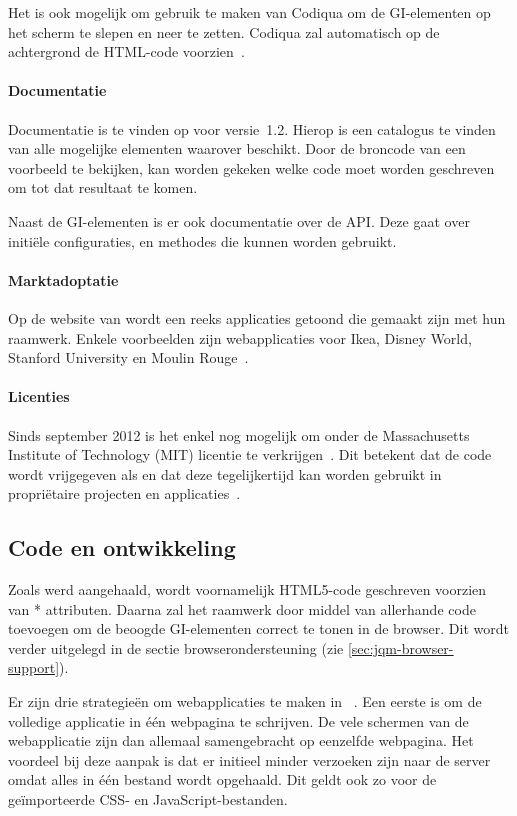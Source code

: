 Het is ook mogelijk om gebruik te maken van Codiqua om de GI-elementen op het scherm te slepen en neer te zetten. 
Codiqua zal automatisch op de achtergrond de HTML-code voorzien~\cite{Sperry2012}.

\paragraph{Documentatie}
Documentatie is te vinden op  voor versie~1.2. 
Hierop is een catalogus te vinden van alle mogelijke elementen waarover \jqm{} beschikt. 
Door de broncode van een voorbeeld te bekijken, kan worden gekeken welke code moet worden geschreven om tot dat resultaat te komen.

Naast de GI-elementen is er ook documentatie over de API. 
Deze gaat over initiële configuraties,  en methodes die kunnen worden gebruikt.

\paragraph{Marktadoptatie}
Op de website van \jqm{} wordt een reeks applicaties getoond die gemaakt zijn met hun raamwerk. 
Enkele voorbeelden zijn webapplicaties voor Ikea, Disney World, Stanford University en Moulin Rouge~\cite{JQuery2012a}. 

\paragraph{Licenties}
Sinds september 2012 is het enkel nog mogelijk om \jqm{} onder de Massachusetts Institute of Technology (MIT) licentie te verkrijgen~\cite{Dmethvin2012}. 
Dit betekent dat de code wordt vrijgegeven als  en dat deze tegelijkertijd kan worden gebruikt in propriëtaire projecten en applicaties~\cite{PhilDutson2012}.

\subsection{Code en ontwikkeling}
Zoals werd aangehaald, wordt voornamelijk HTML5-code geschreven voorzien van * attributen. 
Daarna zal het raamwerk door middel van  allerhande code toevoegen om de beoogde GI-elementen correct te tonen in de browser. 
Dit wordt verder uitgelegd in de sectie browserondersteuning (zie \ref{sec:jqm-browser-support}).

Er zijn drie strategieën om webapplicaties te maken in \jqm{}~\cite{Broulik2012}. 
Een eerste is om de volledige applicatie in één webpagina te schrijven. 
De vele schermen van de webapplicatie zijn dan allemaal samengebracht op eenzelfde webpagina. 
Het voordeel bij deze aanpak is dat er initieel minder verzoeken zijn naar de server omdat alles in één bestand wordt opgehaald. 
Dit geldt ook zo voor de geïmporteerde CSS- en JavaScript-bestanden. 

